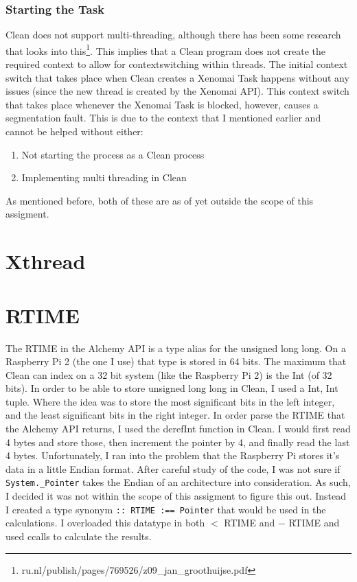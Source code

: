 \documentclass{scrartcl}
\begin{document}
\subsubsection{Starting the Task}
Clean does not support multi-threading, although there has been some research that looks into this\footnote{ru.nl/publish/pages/769526/z09\_jan\_groothuijse.pdf}.
This implies that a Clean program does not create the required context to allow for contextswitching within threads.
The initial context switch that takes place when Clean creates a Xenomai Task happens without any issues (since the new thread is created by the Xenomai API).
This context switch that takes place whenever the Xenomai Task is blocked, however, causes a segmentation fault.
This is due to the context that I mentioned earlier and cannot be helped without either:
\begin{enumerate}
	\item Not starting the process as a Clean process
	\item Implementing multi threading in Clean
\end{enumerate}
As mentioned before, both of these are as of yet outside the scope of this assigment.

\section{Xthread}

\section{RTIME}
The RTIME in the Alchemy API is a type alias for the unsigned long long.
On a Raspberry Pi 2 (the one I use) that type is stored in 64 bits.
The maximum that Clean can index on a 32 bit system (like the Raspberry Pi 2) is the Int (of 32 bits).
In order to be able to store unsigned long long in Clean, I used a Int, Int tuple.
Where the idea was to store the most significant bits in the left integer, and the least significant bits in the right integer.
In order parse the RTIME that the Alchemy API returns, I used the derefInt function in Clean.
I would first read 4 bytes and store those, then increment the pointer by 4, and finally read the last 4 bytes.
Unfortunately, I ran into the problem that the Raspberry Pi stores it's data in a little Endian format.
After careful study of the code, I was not sure if \texttt{System._Pointer} takes the Endian of an architecture into consideration.
As such, I decided it was not within the scope of this assigment to figure this out.
Instead I created a type synonym \texttt{:: RTIME :== Pointer} that would be used in the calculations.
I overloaded this datatype in both $<$ RTIME and $-$ RTIME and used ccalls to calculate the results.
\end{document}

